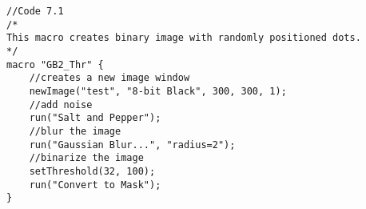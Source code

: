 \begin{lstlisting}
//Code 7.1
/*  
This macro creates binary image with randomly positioned dots.  
*/
macro "GB2_Thr" {
	//creates a new image window
	newImage("test", "8-bit Black", 300, 300, 1);
	//add noise
	run("Salt and Pepper");
	//blur the image
	run("Gaussian Blur...", "radius=2");
	//binarize the image
	setThreshold(32, 100);
	run("Convert to Mask");
}






\end{lstlisting}